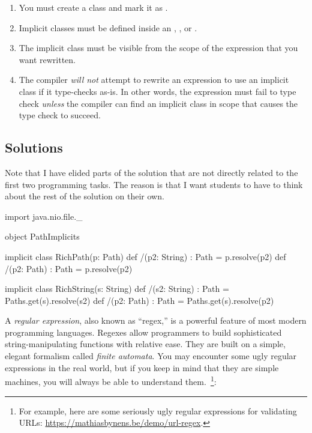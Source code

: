 \documentclass[9pt]{extbook}
\begin{document}
\begin{enumerate}
  \item You must create a class and mark it as .
  \item Implicit classes must be defined inside an , , or .
  \item The implicit class must be visible from the scope of the expression that you want rewritten.
  \item The compiler \emph{will not} attempt to rewrite an expression to use an implicit class if it type-checks as-is.  In other words, the expression must fail to type check \emph{unless} the compiler can find an implicit class in scope that causes the type check to succeed.
\end{enumerate}

\begin{instructor}
\section{Solutions}
  
Note that I have elided parts of the solution that are not directly related to the first two programming tasks.  The reason is that I want students to have to think about the rest of the solution on their own.

\begin{scalacode}
  import java.nio.file._

  object PathImplicits {  
    implicit class RichPath(p: Path) {
      def /(p2: String) : Path = p.resolve(p2)
      def /(p2: Path) : Path = p.resolve(p2)
    }

    implicit class RichString(s: String) {
      def /(s2: String) : Path = Paths.get(s).resolve(s2)
      def /(p2: Path) : Path = Paths.get(s).resolve(p2)
    }
  }
\end{scalacode}
  
\end{instructor}



A \emph{regular expression}, also known as ``regex,'' is a powerful feature of most modern programming languages.  Regexes allow programmers to build sophisticated string-manipulating functions with relative ease.  They are built on a simple, elegant formalism called \emph{finite automata}.  You may encounter some ugly regular expressions in the real world, but if you keep in mind that they are simple machines, you will always be able to understand them.~\footnote{For example, here are some seriously ugly regular expressions for validating URLs: \url{https://mathiasbynens.be/demo/url-regex}.}:
\end{document}
